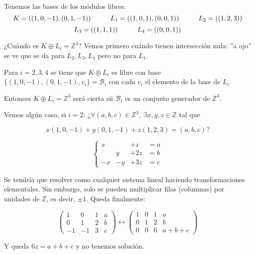 \documentclass[openany]{book}
\begin{document}
\begin{exercise}$ $

    Tenemos las bases de los módulos libres:
    $$ K = ((1,0,-1),(0,1,-1)) \hspace{10mm} L_1 = ((1,0,1),(0,0,1)) \hspace{10mm} L_2 = ((1,2,3)) $$
    $$ L_3 = ((1,1,1)) \hspace{10mm} L_4 = ((0,0,1)) $$

    ¿Cuándo es $ K \oplus L_i = \mathbb{Z}^{3}$? Vemos primero cuándo tienen intersección nula: ''a ojo'' se ve que se da para $ L_2,L_3,L_4$ pero no para $ L_1$.

    Para $ i = 2,3,4$ se tiene que $ K \oplus L_i$ es libre con base $ \{(1,0,-1),(0,1,-1),v_i\} = \mathcal{B}_{i}$ con cada $ v_i$ el elemento de la base de $ L_i$.

    Entonces $ K \oplus L_i = \mathbb{Z}^3$ será cierta sii $ \mathcal{B}_{i}$ es un conjunto generador de $ \mathbb{Z}^{3}$.

    Vemos algún caso, si $ i = 2$: ¿$ \forall (a,b,c) \in \mathbb{Z}^3,\ \exists x,y,z \in \mathbb{Z}$ tal que

    $$ x(1,0,-1)+y(0,1,-1)+z(1,2,3) = (a,b,c)? $$

    $$ \left\{
    \begin{array}{rrrr}
        x & & +z & = a\\ 
        & y & +2z & = b\\ 
        -x & -y & +3z & = c
    \end{array}
    \right. $$

    Se tendría que resolver como cualquier sistema lineal haciendo transformaciones elementales. Sin embargo, solo se pueden multiplicar filas (columnas) por unidades de $ \mathbb{Z}$, es decir, $ \pm 1$. Queda finalmente:

    $$ 
    \left(\begin{array}{ccc|c}
        1 & 0 & 1 & a\\ 
        0 & 1 & 2 & b\\ 
        -1 & -1 & 3 & c
    \end{array}\right)
    \leftrightarrow 
    \left(\begin{array}{ccc|c}
        1 & 0 & 1 & a\\ 
        0 & 1 & 2 & b\\ 
        0 & 0 & 6 & a+b+c
    \end{array}\right)
    $$

    Y queda $ 6z=a+b+c$ y no tenemos solución.


\end{exercise}
\end{document}
